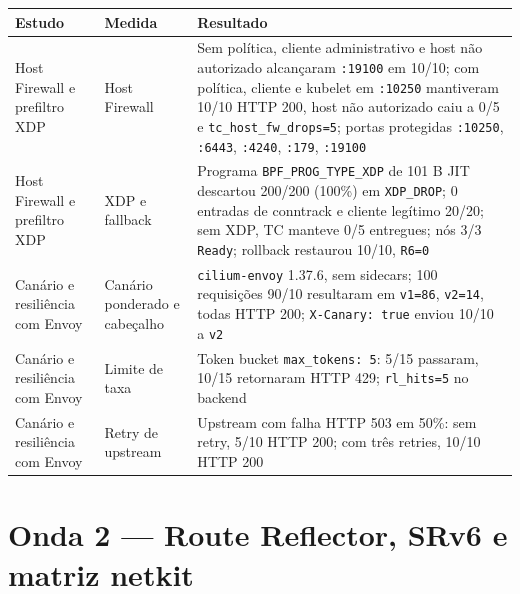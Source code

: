 \documentclass[12pt,openany,oneside,a4paper,chapter=TITLE,english,brazil]{abntex2}
\begin{document}
\begin{quadro}[!htbp]
\caption{Resultados de segurança do nó e tráfego L7}
\footnotesize
\begin{tabularx}{\textwidth}{|>{\raggedright\arraybackslash\hsize=0.661\hsize}X|>{\raggedright\arraybackslash\hsize=0.639\hsize}X|>{\raggedright\arraybackslash\hsize=1.700\hsize}X|}
\hline
\textbf{Estudo} & \textbf{Medida} & \textbf{Resultado} \\
\hline
Host Firewall e prefiltro XDP & Host Firewall & Sem política, cliente administrativo e host não autorizado alcançaram
\texttt{:\allowbreak{}19100} em 10/10; com política, cliente e kubelet
em \texttt{:\allowbreak{}10250} mantiveram 10/10 HTTP 200, host não
autorizado caiu a 0/5 e
\texttt{tc\_\allowbreak{}host\_\allowbreak{}fw\_\allowbreak{}drops=\allowbreak{}5};
portas protegidas \texttt{:\allowbreak{}10250},
\texttt{:\allowbreak{}6443}, \texttt{:\allowbreak{}4240},
\texttt{:\allowbreak{}179}, \texttt{:\allowbreak{}19100} \\
\hline
Host Firewall e prefiltro XDP & XDP e fallback & Programa
\texttt{BPF\_\allowbreak{}PROG\_\allowbreak{}TYPE\_\allowbreak{}XDP} de
101 B JIT descartou 200/200 (100\%) em \texttt{XDP\_\allowbreak{}DROP};
0 entradas de conntrack e cliente legítimo 20/20; sem XDP, TC manteve
0/5 entregues; nós 3/3 \texttt{Ready}; rollback restaurou 10/10,
\texttt{R6=\allowbreak{}0} \\
\hline
Canário e resiliência com Envoy & Canário ponderado e cabeçalho & \texttt{cilium-{}\allowbreak{}envoy} 1.37.6, sem sidecars; 100
requisições 90/10 resultaram em \texttt{v1=\allowbreak{}86},
\texttt{v2=\allowbreak{}14}, todas HTTP 200;
\texttt{X-{}\allowbreak{}Canary:\allowbreak{} true} enviou 10/10 a
\texttt{v2} \\
\hline
Canário e resiliência com Envoy & Limite de taxa & Token bucket \texttt{max\_\allowbreak{}tokens:\allowbreak{} 5}: 5/15
passaram, 10/15 retornaram HTTP 429;
\texttt{rl\_\allowbreak{}hits=\allowbreak{}5} no backend \\
\hline
Canário e resiliência com Envoy & Retry de upstream & Upstream com falha HTTP 503 em 50\%: sem retry, 5/10 HTTP 200; com três
retries, 10/10 HTTP 200 \\
\hline
\end{tabularx}
\end{quadro}

\section{Onda 2 --- Route Reflector, SRv6 e matriz netkit}\label{onda-2-route-reflector-srv6-e-matriz-netkit}
\end{document}
